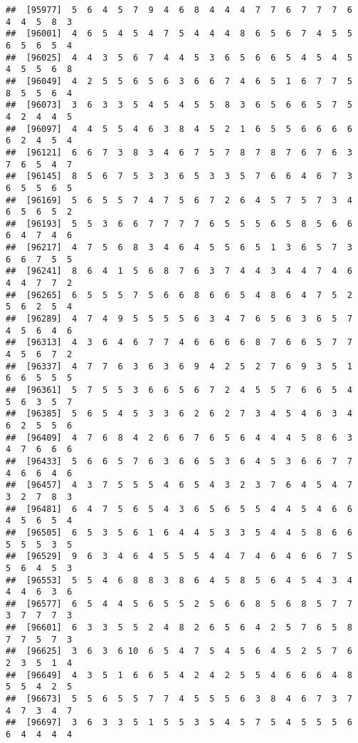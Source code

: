 \documentclass[
]{book}
\begin{document}
\begin{verbatim}
##  [95977]  5  6  4  5  7  9  4  6  8  4  4  4  7  7  6  7  7  7  6  4  4  5  8  3
##  [96001]  4  6  5  4  5  4  7  5  4  4  4  8  6  5  6  7  4  5  5  6  5  6  5  4
##  [96025]  4  4  3  5  6  7  4  4  5  3  6  5  6  6  5  4  5  4  5  4  5  5  6  8
##  [96049]  4  2  5  5  6  5  6  3  6  6  7  4  6  5  1  6  7  7  5  8  5  5  6  4
##  [96073]  3  6  3  3  5  4  5  4  5  5  8  3  6  5  6  6  5  7  5  4  2  4  4  5
##  [96097]  4  4  5  5  4  6  3  8  4  5  2  1  6  5  5  6  6  6  6  6  2  4  5  4
##  [96121]  6  6  7  3  8  3  4  6  7  5  7  8  7  8  7  6  7  6  3  7  6  5  4  7
##  [96145]  8  5  6  7  5  3  3  6  5  3  3  5  7  6  6  4  6  7  3  6  5  5  6  5
##  [96169]  5  6  5  5  7  4  7  5  6  7  2  6  4  5  7  5  7  3  4  6  5  6  5  2
##  [96193]  5  5  3  6  6  7  7  7  7  6  5  5  5  6  5  8  5  6  6  6  4  7  4  6
##  [96217]  4  7  5  6  8  3  4  6  4  5  5  6  5  1  3  6  5  7  3  6  6  7  5  5
##  [96241]  8  6  4  1  5  6  8  7  6  3  7  4  4  3  4  4  7  4  6  4  4  7  7  2
##  [96265]  6  5  5  5  7  5  6  6  8  6  6  5  4  8  6  4  7  5  2  5  6  2  5  4
##  [96289]  4  7  4  9  5  5  5  5  6  3  4  7  6  5  6  3  6  5  7  4  5  6  4  6
##  [96313]  4  3  6  4  6  7  7  4  6  6  6  6  8  7  6  6  5  7  7  4  5  6  7  2
##  [96337]  4  7  7  6  3  6  3  6  9  4  2  5  2  7  6  9  3  5  1  6  6  5  5  5
##  [96361]  5  7  5  5  3  6  6  5  6  7  2  4  5  5  7  6  6  5  4  5  6  3  5  7
##  [96385]  5  6  5  4  5  3  3  6  2  6  2  7  3  4  5  4  6  3  4  6  2  5  5  6
##  [96409]  4  7  6  8  4  2  6  6  7  6  5  6  4  4  4  5  8  6  3  4  7  6  6  6
##  [96433]  5  6  6  5  7  6  3  6  6  5  3  6  4  5  3  6  6  7  7  4  6  6  4  6
##  [96457]  4  3  7  5  5  5  4  6  5  4  3  2  3  7  6  4  5  4  7  3  2  7  8  3
##  [96481]  6  4  7  5  6  5  4  3  6  5  6  5  5  4  4  5  4  6  6  4  5  6  5  4
##  [96505]  6  5  3  5  6  1  6  4  4  5  3  3  5  4  4  5  8  6  6  5  5  5  3  5
##  [96529]  9  6  3  4  6  4  5  5  5  4  4  7  4  6  4  6  6  7  5  5  6  4  5  3
##  [96553]  5  5  4  6  8  8  3  8  6  4  5  8  5  6  4  5  4  3  4  4  4  6  3  6
##  [96577]  6  5  4  4  5  6  5  5  2  5  6  6  8  5  6  8  5  7  7  3  7  7  7  3
##  [96601]  6  3  3  5  5  2  4  8  2  6  5  6  4  2  5  7  6  5  8  7  7  5  7  3
##  [96625]  3  6  3  6 10  6  5  4  7  5  4  5  6  4  5  2  5  7  6  2  3  5  1  4
##  [96649]  4  3  5  1  6  6  5  4  2  4  2  5  5  4  6  6  6  4  8  5  5  4  2  5
##  [96673]  5  5  6  5  5  7  7  4  5  5  5  6  3  8  4  6  7  3  7  4  7  3  4  7
##  [96697]  3  6  3  3  5  1  5  5  3  5  4  5  7  5  4  5  5  5  6  6  4  4  4  4

\end{verbatim}
\end{document}
